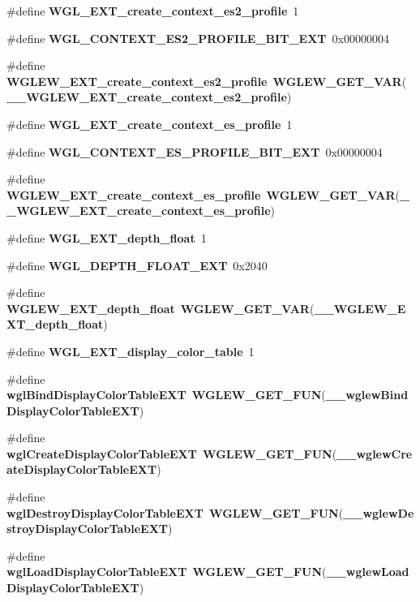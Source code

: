 \begin{DoxyCompactItemize}
\item 
\#define {\bf W\+G\+L\+\_\+\+E\+X\+T\+\_\+create\+\_\+context\+\_\+es2\+\_\+profile}~1
\item 
\#define {\bf W\+G\+L\+\_\+\+C\+O\+N\+T\+E\+X\+T\+\_\+\+E\+S2\+\_\+\+P\+R\+O\+F\+I\+L\+E\+\_\+\+B\+I\+T\+\_\+\+E\+XT}~0x00000004
\item 
\#define {\bf W\+G\+L\+E\+W\+\_\+\+E\+X\+T\+\_\+create\+\_\+context\+\_\+es2\+\_\+profile}~{\bf W\+G\+L\+E\+W\+\_\+\+G\+E\+T\+\_\+\+V\+AR}({\bf \+\_\+\+\_\+\+W\+G\+L\+E\+W\+\_\+\+E\+X\+T\+\_\+create\+\_\+context\+\_\+es2\+\_\+profile})
\item 
\#define {\bf W\+G\+L\+\_\+\+E\+X\+T\+\_\+create\+\_\+context\+\_\+es\+\_\+profile}~1
\item 
\#define {\bf W\+G\+L\+\_\+\+C\+O\+N\+T\+E\+X\+T\+\_\+\+E\+S\+\_\+\+P\+R\+O\+F\+I\+L\+E\+\_\+\+B\+I\+T\+\_\+\+E\+XT}~0x00000004
\item 
\#define {\bf W\+G\+L\+E\+W\+\_\+\+E\+X\+T\+\_\+create\+\_\+context\+\_\+es\+\_\+profile}~{\bf W\+G\+L\+E\+W\+\_\+\+G\+E\+T\+\_\+\+V\+AR}({\bf \+\_\+\+\_\+\+W\+G\+L\+E\+W\+\_\+\+E\+X\+T\+\_\+create\+\_\+context\+\_\+es\+\_\+profile})
\item 
\#define {\bf W\+G\+L\+\_\+\+E\+X\+T\+\_\+depth\+\_\+float}~1
\item 
\#define {\bf W\+G\+L\+\_\+\+D\+E\+P\+T\+H\+\_\+\+F\+L\+O\+A\+T\+\_\+\+E\+XT}~0x2040
\item 
\#define {\bf W\+G\+L\+E\+W\+\_\+\+E\+X\+T\+\_\+depth\+\_\+float}~{\bf W\+G\+L\+E\+W\+\_\+\+G\+E\+T\+\_\+\+V\+AR}({\bf \+\_\+\+\_\+\+W\+G\+L\+E\+W\+\_\+\+E\+X\+T\+\_\+depth\+\_\+float})
\item 
\#define {\bf W\+G\+L\+\_\+\+E\+X\+T\+\_\+display\+\_\+color\+\_\+table}~1
\item 
\#define {\bf wgl\+Bind\+Display\+Color\+Table\+E\+XT}~{\bf W\+G\+L\+E\+W\+\_\+\+G\+E\+T\+\_\+\+F\+UN}({\bf \+\_\+\+\_\+wglew\+Bind\+Display\+Color\+Table\+E\+XT})
\item 
\#define {\bf wgl\+Create\+Display\+Color\+Table\+E\+XT}~{\bf W\+G\+L\+E\+W\+\_\+\+G\+E\+T\+\_\+\+F\+UN}({\bf \+\_\+\+\_\+wglew\+Create\+Display\+Color\+Table\+E\+XT})
\item 
\#define {\bf wgl\+Destroy\+Display\+Color\+Table\+E\+XT}~{\bf W\+G\+L\+E\+W\+\_\+\+G\+E\+T\+\_\+\+F\+UN}({\bf \+\_\+\+\_\+wglew\+Destroy\+Display\+Color\+Table\+E\+XT})
\item 
\#define {\bf wgl\+Load\+Display\+Color\+Table\+E\+XT}~{\bf W\+G\+L\+E\+W\+\_\+\+G\+E\+T\+\_\+\+F\+UN}({\bf \+\_\+\+\_\+wglew\+Load\+Display\+Color\+Table\+E\+XT})

\end{DoxyCompactItemize}
